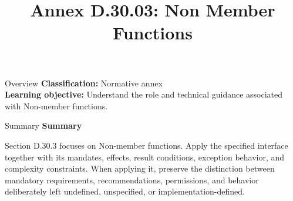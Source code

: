 \documentclass[10pt,letterpaper]{article}
\title{Annex D.30.03: Non Member Functions}
\author{}
\date{}
\begin{document}
\maketitle
\begin{CornellOverviewBox}{Overview}
\textbf{Classification:} Normative annex\\[2pt]
\textbf{Learning objective:} Understand the role and technical guidance associated with Non-member functions.
\end{CornellOverviewBox}\begin{CornellSummaryBox}{Summary}
{\sffamily\bfseries\color{Accent} Summary}\par\vspace{3pt}Section D.30.3 focuses on Non-member functions. Apply the specified interface together with its mandates, effects, result conditions, exception behavior, and complexity constraints. When applying it, preserve the distinction between mandatory requirements, recommendations, permissions, and behavior deliberately left undefined, unspecified, or implementation-defined.
\end{CornellSummaryBox}
\end{document}
